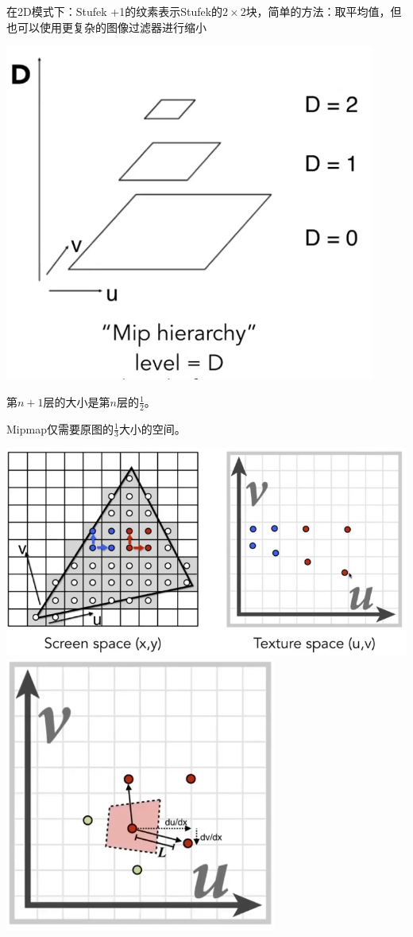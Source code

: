 \documentclass[fleqn]{article}
\begin{document}
在2D模式下：Stufek +1的纹素表示Stufek的$2\times 2$块，简单的方法：取平均值，但也可以使用更复杂的图像过滤器进行缩小

\begin{center}
    \includegraphics[scale=0.3]{24.png}
\end{center}

第$n+1$层的大小是第$n$层的$\frac{1}{2}$。

Mipmap仅需要原图的$\frac{1}{3}$大小的空间。

\begin{center}
    \includegraphics[scale=0.3]{26.png}
    \includegraphics[scale=0.34]{25.png}
\end{center}
\end{document}
